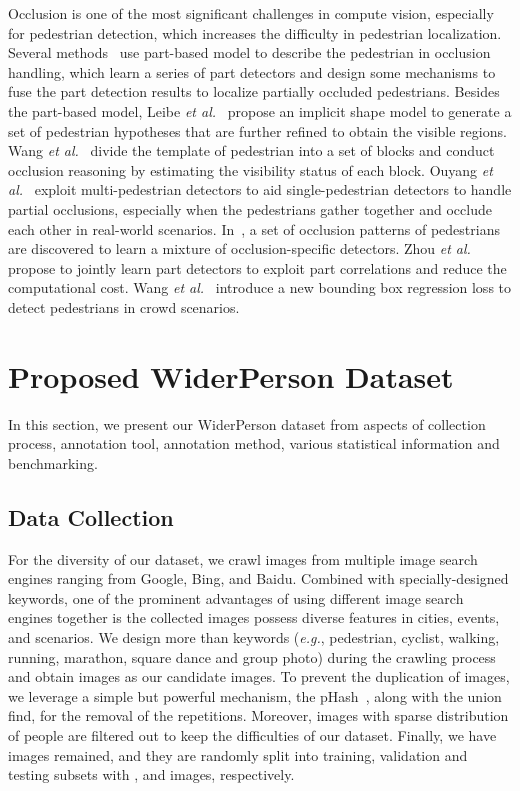 \documentclass[journal]{IEEEtran}
\def\eg{{\em e.g.}}
\def\etal{{\em et al.}}
\begin{document}
Occlusion is one of the most significant challenges in compute vision, especially for pedestrian detection, which increases the difficulty in pedestrian localization. Several methods~\cite{DBLP:conf/cvpr/OuyangW12,DBLP:conf/iccv/TianLWT15,DBLP:conf/accv/ZhouY16,DBLP:conf/iccv/WuN05,DBLP:conf/eccv/DuanAL10} use part-based model to describe the pedestrian in occlusion handling, which learn a series of part detectors and design some mechanisms to fuse the part detection results to localize partially occluded pedestrians. Besides the part-based model, Leibe \etal~\cite{DBLP:conf/cvpr/LeibeSS05} propose an implicit shape model to generate a set of pedestrian hypotheses that are further refined to obtain the visible regions. Wang \etal~\cite{DBLP:conf/iccv/WangHY09} divide the template of pedestrian into a set of blocks and conduct occlusion reasoning by estimating the visibility status of each block. Ouyang \etal~\cite{DBLP:conf/cvpr/OuyangW13} exploit multi-pedestrian detectors to aid single-pedestrian detectors to handle partial occlusions, especially when the pedestrians gather together and occlude each other in real-world scenarios. In~\cite{DBLP:conf/cvpr/PepikSGS13}, a set of occlusion patterns of pedestrians are discovered to learn a mixture of occlusion-specific detectors. Zhou \etal~\cite{DBLP:conf/iccv/ZhouY17} propose to jointly learn part detectors to exploit part correlations and reduce the computational cost. Wang \etal~\cite{DBLP:journals/corr/abs-1711-07752} introduce a new bounding box regression loss to detect pedestrians in crowd scenarios.

\section{Proposed WiderPerson Dataset}\label{3}
In this section, we present our WiderPerson dataset from aspects of collection process, annotation tool, annotation method, various statistical information and benchmarking.

\subsection{Data Collection}
For the diversity of our dataset, we crawl images from multiple image search engines ranging from Google, Bing, and Baidu. Combined with specially-designed keywords, one of the prominent advantages of using different image search engines together is the collected images possess diverse features in cities, events, and scenarios. We design more than  keywords (\eg, pedestrian, cyclist, walking, running, marathon, square dance and group photo) during the crawling process and obtain  images as our candidate images. To prevent the duplication of images, we leverage a simple but powerful mechanism, the pHash~\cite{DBLP:conf/ccs/MihcakV01}, along with the union find, for the removal of the repetitions. Moreover, images with sparse distribution of people are filtered out to keep the difficulties of our dataset. Finally, we have  images remained, and they are randomly split into training, validation and testing subsets with ,  and  images, respectively.
\end{document}
